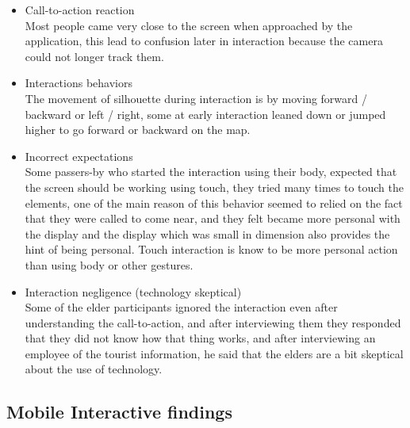 \begin{enumerate}
\begin{itemize}
\item Call-to-action reaction \\
Most people came very close to the screen when approached by the application, this lead to confusion later in interaction because the camera could not longer track them.

\item Interactions behaviors \\
The movement of silhouette during interaction is by moving forward / backward or left / right, some at early interaction leaned down or jumped higher to go forward or backward on the map.


\item Incorrect expectations \\
Some passers-by who started the interaction using their body, expected that the screen should be working using touch, they tried many times to touch the elements, one of the main reason of this behavior seemed to relied on the fact that they were called to come near, and they felt became more personal with the display and the display which was small in dimension also provides the hint of being personal. Touch interaction is know to be more personal action than using body or other gestures. 


\item Interaction negligence (technology skeptical) \\
Some of the elder participants ignored the interaction even after understanding the call-to-action, and after interviewing them they responded that they did not know how that thing works, and after interviewing an employee of the tourist information, he said that the elders are a bit skeptical about the use of technology. 

\end{itemize}

\end{enumerate}







\newpage
\subsection{Mobile Interactive findings}

